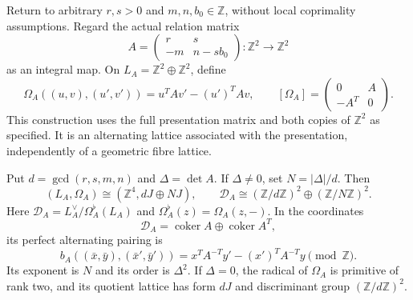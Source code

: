 \documentclass[11pt]{article}
\numberwithin{equation}{section}
\begin{document}
Return to arbitrary $r,s>0$ and $m,n,b_0\in\mathbb Z$, without
local coprimality assumptions.  Regard the actual relation matrix
\[
 A=\begin{pmatrix}r&s\\-m&n-sb_0\end{pmatrix}:\mathbb Z^2\to\mathbb Z^2
\]
as an integral map.  On $L_A=\mathbb Z^2\oplus\mathbb Z^2$, define
\begin{equation}\label{eq:doubled-form}
 \Omega_A((u,v),(u',v'))=u^TAv'-(u')^TAv,\qquad
 [\Omega_A]=\begin{pmatrix}0&A\\-A^T&0\end{pmatrix}.
\end{equation}
This construction uses the full presentation matrix and both copies of
$\mathbb Z^2$ as specified.  It is an alternating lattice associated
with the presentation, independently of a geometric fibre lattice.

\begin{theorem}\label{thm:double}
Put $d=\gcd(r,s,m,n)$ and $\Delta=\det A$.
If $\Delta\ne0$, set $N=|\Delta|/d$.  Then
\[
 (L_A,\Omega_A)\cong (\mathbb Z^4,dJ\oplus NJ),\qquad
 \mathcal D_A\cong(\mathbb Z/d\mathbb Z)^2
                    \oplus(\mathbb Z/N\mathbb Z)^2.
\]
Here $\mathcal D_A=L_A^\vee/\Omega_A^\flat(L_A)$ and
$\Omega_A^\flat(z)=\Omega_A(z,-)$.  In the coordinates
\[
 \mathcal D_A=\operatorname{coker}A\oplus\operatorname{coker}A^T,
\]
its perfect alternating pairing is
\begin{equation}\label{eq:arithmetic-pairing}
 b_A((\bar x,\bar y),(\bar x',\bar y'))
     =x^TA^{-T}y'-(x')^TA^{-T}y\pmod{\mathbb Z}.
\end{equation}
Its exponent is $N$ and its order is $\Delta^2$.
If $\Delta=0$, the radical of $\Omega_A$ is primitive of rank two,
and its quotient lattice has form $dJ$ and discriminant group
$(\mathbb Z/d\mathbb Z)^2$.
\end{theorem}
\end{document}

